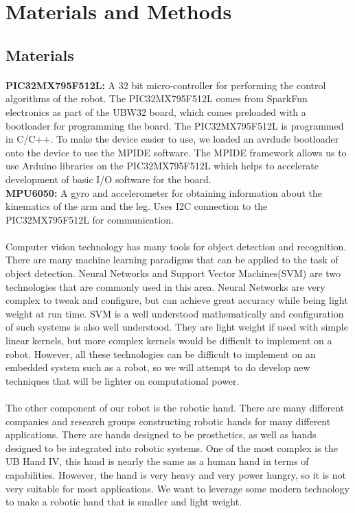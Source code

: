 \documentclass{article}
\begin{document}
\section{Materials and Methods}
\subsection{Materials}
\paragraph{}
\textbf{PIC32MX795F512L:} A 32 bit micro-controller for performing the control
algorithms of the robot. The PIC32MX795F512L comes from SparkFun electronics as
part of the UBW32 board, which comes preloaded with a bootloader for programming
the board. The PIC32MX795F512L is programmed in C/C++. To make the device easier
to use, we loaded an avrdude bootloader onto the device to use the MPIDE
software. The MPIDE framework allows us to use Arduino libraries on the
PIC32MX795F512L which helps to accelerate development of basic I/O software for
the board\cite{pic32datasheet}. \\

\textbf{MPU6050:} A gyro and accelerometer for obtaining information about the
kinematics of the arm and the leg. Uses I2C connection to the PIC32MX795F512L
for communication.

\paragraph{} Computer vision technology has many tools for object detection and
recognition.  There are many machine learning paradigms that can be applied to
the task of object detection. Neural Networks and Support Vector Machines(SVM)
are two technologies that are commonly used in this area. Neural Networks are
very complex to tweak and configure, but can achieve great accuracy while being
light weight at run time. SVM is a well understood mathematically and
configuration of such systems is also well understood. They are light weight if
used with simple linear kernels, but more complex kernels would be difficult to
implement on a robot\cite{SVMStackOverflow}. However, all these technologies
can be difficult to implement on an embedded system such as a robot, so we will
attempt to do develop new techniques that will be lighter on computational
power.

\paragraph{} The other component of our robot is the robotic hand. There are
many different companies and research groups constructing robotic hands for
many different applications. There are hands designed to be prosthetics, as
well as hands designed to be integrated into robotic systems. One of the most
complex is the UB Hand IV, this hand is nearly the same as a human hand in
terms of capabilities. However, the hand is very heavy and very power hungry,
so it is not very suitable for most applications\cite{Melchiorri2013}. We want
to leverage some modern technology to make a robotic hand that is smaller and
light weight.
\end{document}
